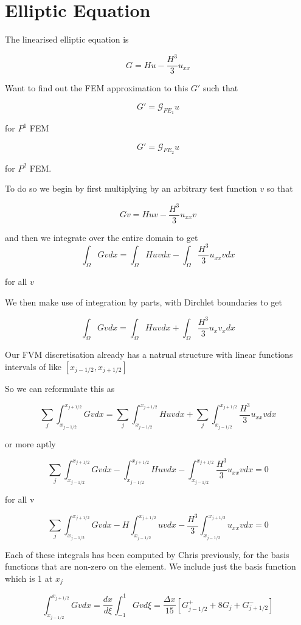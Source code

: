 \documentclass[12pt]{article}
\begin{document}
\section{Elliptic Equation}
The linearised elliptic equation is

\[G = Hu - \frac{H^3}{3}u_{xx}\]

Want to find out the FEM approximation to this $G'$ such that

\[G' = \mathcal{G}_{FE_1} u\]

for $P^1$ FEM

\[G' = \mathcal{G}_{FE_2} u\]

for $P^2$ FEM.

To do so we begin by first multiplying by an arbitrary test function $v$ so that

\[Gv = Huv - \frac{H^3}{3}u_{xx}v\]

and then we integrate over the entire domain to get 
\[\int_\Omega Gv dx = \int_\Omega Huv dx - \int_\Omega \frac{H^3}{3}u_{xx}vdx\]

for all $v$

We then make use of integration by parts, with Dirchlet boundaries to get

\[\int_\Omega Gv dx = \int_\Omega Huv dx + \int_\Omega \frac{H^3}{3}u_{x}v_xdx\]

Our FVM discretisation already has a natrual structure with linear functions intervals of like $[x_{j- 1/2} , x_{j+1/2}]$

So we can reformulate this as 

\[\sum_{j}\int_{x_{j-1/2}}^{x_{j+1/2}} Gv dx = \sum_{j}\int_{x_{j-1/2}}^{x_{j+1/2}} Huv dx + \sum_{j}\int_{x_{j-1/2}}^{x_{j+1/2}} \frac{H^3}{3}u_{xx}vdx\]

or more aptly

\[\sum_{j}\int_{x_{j-1/2}}^{x_{j+1/2}} Gv dx - \int_{x_{j-1/2}}^{x_{j+1/2}} Huv dx - \int_{x_{j-1/2}}^{x_{j+1/2}} \frac{H^3}{3}u_{xx}vdx = 0 \]

for all v

\[\sum_{j}\int_{x_{j-1/2}}^{x_{j+1/2}} Gv dx - H\int_{x_{j-1/2}}^{x_{j+1/2}} uv dx -  \frac{H^3}{3}\int_{x_{j-1/2}}^{x_{j+1/2}}u_{xx}vdx = 0 \]

Each of these integrals has been computed by Chris previously, for the basis functions that are non-zero on the element. We include just the basis function which is 1 at $x_j$

\[\int_{x_{j-1/2}}^{x_{j+1/2}} Gv dx = \frac{dx}{d\xi}\int_{-1}^{1} Gv d\xi  = \frac{\Delta x}{15} \left[
G^+_{j - 1/2} + 8G_{j} + G^{-}_{j+1/2} \right]\]
\end{document}
